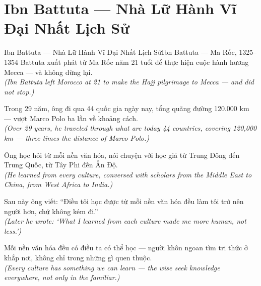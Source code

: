 \section{Ibn Battuta --- Nhà Lữ Hành Vĩ Đại Nhất Lịch Sử}
\begin{truyen}{Ibn Battuta --- Nhà Lữ Hành Vĩ Đại Nhất Lịch Sử}{Ibn Battuta --- Ma Rốc, 1325--1354}
 Battuta xuất phát từ Ma Rốc năm 21 tuổi để thực hiện cuộc hành hương Mecca --- và không dừng lại.\\[4pt]
\textit{(Ibn Battuta left Morocco at 21 to make the Hajj pilgrimage to Mecca --- and did not stop.)}

Trong 29 năm, ông đi qua 44 quốc gia ngày nay, tổng quãng đường 120.000 km --- vượt Marco Polo ba lần về khoảng cách.\\[4pt]
\textit{(Over 29 years, he traveled through what are today 44 countries, covering 120,000 km --- three times the distance of Marco Polo.)}

Ông học hỏi từ mỗi nền văn hóa, nói chuyện với học giả từ Trung Đông đến Trung Quốc, từ Tây Phi đến Ấn Độ.\\[4pt]
\textit{(He learned from every culture, conversed with scholars from the Middle East to China, from West Africa to India.)}

Sau này ông viết: ``Điều tôi học được từ mỗi nền văn hóa đều làm tôi trở nên người hơn, chứ không kém đi.''\\[4pt]
\textit{(Later he wrote: `What I learned from each culture made me more human, not less.')}

\end{truyen}
\begin{baihoc}
  Mỗi nền văn hóa đều có điều ta có thể học --- người khôn ngoan tìm tri thức ở khắp nơi, không chỉ trong những gì quen thuộc.\\[4pt]
  \textit{(Every culture has something we can learn --- the wise seek knowledge everywhere, not only in the familiar.)}
\end{baihoc}

